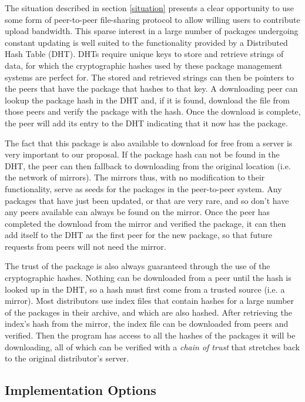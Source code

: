 \documentclass[conference]{IEEEtran}
\begin{document}
The situation described in section \ref{situation} presents a clear
opportunity to use some form of peer-to-peer file-sharing protocol
to allow willing users to contribute upload bandwidth. This sparse
interest in a large number of packages undergoing constant updating
is well suited to the functionality provided by a Distributed Hash
Table (DHT). DHTs require unique keys to store and retrieve strings
of data, for which the cryptographic hashes used by these package
management systems are perfect for. The stored and retrieved strings
can then be pointers to the peers that have the package that hashes
to that key. A downloading peer can lookup the package hash in the
DHT and, if it is found, download the file from those peers and
verify the package with the hash. Once the download is complete, the
peer will add its entry to the DHT indicating that it now has the
package.

The fact that this package is also available to download for free
from a server is very important to our proposal. If the package hash
can not be found in the DHT, the peer can then fallback to
downloading from the original location (i.e. the network of
mirrors). The mirrors thus, with no modification to their
functionality, serve as seeds for the packages in the peer-to-peer
system. Any packages that have just been updated, or that are very
rare, and so don't have any peers available can always be found on
the mirror. Once the peer has completed the download from the mirror
and verified the package, it can then add itself to the DHT as the
first peer for the new package, so that future requests from peers
will not need the mirror.

The trust of the package is also always guaranteed through the use
of the cryptographic hashes. Nothing can be downloaded from a peer
until the hash is looked up in the DHT, so a hash must first come
from a trusted source (i.e. a mirror). Most distributors use index
files that contain hashes for a large number of the packages in
their archive, and which are also hashed. After retrieving the
index's hash from the mirror, the index file can be downloaded from
peers and verified. Then the program has access to all the hashes of
the packages it will be downloading, all of which can be verified
with a \emph{chain of trust} that stretches back to the original
distributor's server.

\subsection{Implementation Options}
\label{imp_options}
\end{document}
